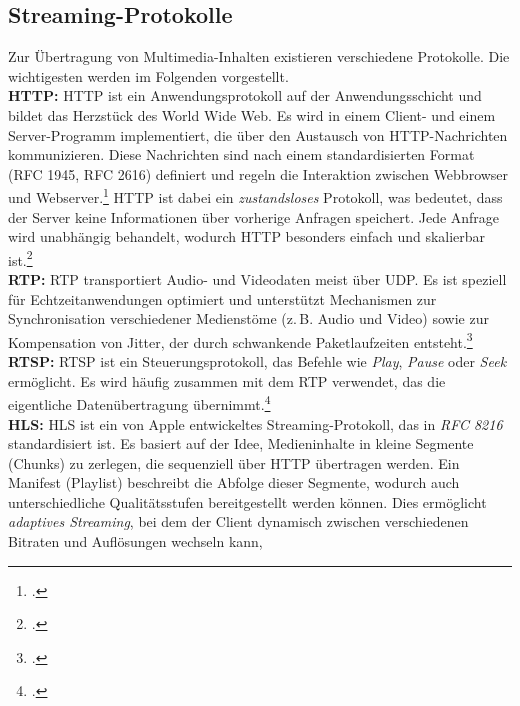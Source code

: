 \documentclass[12pt,a4paper]{report}
\begin{document}
  \subsection{Streaming-Protokolle} 
  Zur Übertragung von Multimedia-Inhalten existieren verschiedene Protokolle. 
  Die wichtigesten werden im Folgenden vorgestellt.  
  \\
  \newline
  \textbf{HTTP:}
  \ac{HTTP} ist ein Anwendungsprotokoll auf der Anwendungsschicht und bildet das Herzstück des World Wide Web. 
  Es wird in einem Client- und einem Server-Programm implementiert, die über den Austausch von \ac{HTTP}-Nachrichten kommunizieren. 
  Diese Nachrichten sind nach einem standardisierten Format (RFC 1945, RFC 2616) definiert und regeln die Interaktion zwischen Webbrowser und Webserver.\footcite[Vgl.][S.~126]{kurose_networking} 
  \ac{HTTP} ist dabei ein \emph{zustandsloses} Protokoll, was bedeutet, dass der Server keine Informationen über vorherige Anfragen speichert. 
  Jede Anfrage wird unabhängig behandelt, wodurch \ac{HTTP} besonders einfach und skalierbar ist.\footcite[Vgl.][S.~128]{kurose_networking}   
  \\
  \newline
  \textbf{RTP:}  
  \ac{RTP} transportiert Audio- und Videodaten meist über \ac{UDP}. 
  Es ist speziell für Echtzeitanwendungen optimiert und unterstützt Mechanismen zur 
  Synchronisation verschiedener Medienstöme (z.\,B. Audio und Video) 
  sowie zur Kompensation von Jitter, der durch schwankende Paketlaufzeiten entsteht.\footcite[Vgl.][S.~546~ff.]{tanenbaum_computernetworks}   
  \\
  \newline
  \textbf{RTSP:}  
  \ac{RTSP} ist ein Steuerungsprotokoll, das Befehle wie \emph{Play}, \emph{Pause} oder \emph{Seek} ermöglicht. 
  Es wird häufig zusammen mit dem \ac{RTP} verwendet, 
  das die eigentliche Datenübertragung übernimmt.\footcite[Vgl.][S.~638~f.]{kurose_networking}  
  \\
  \newline
  \textbf{HLS:}
  \ac{HLS} ist ein von Apple entwickeltes Streaming-Protokoll, das in \emph{RFC 8216} standardisiert ist.
  Es basiert auf der Idee, Medieninhalte in kleine Segmente (Chunks) zu zerlegen, die sequenziell über \ac{HTTP} übertragen werden.
  Ein Manifest (Playlist) beschreibt die Abfolge dieser Segmente, wodurch auch unterschiedliche Qualitätsstufen bereitgestellt werden können.
  Dies ermöglicht \emph{adaptives Streaming}, bei dem der Client dynamisch zwischen verschiedenen Bitraten und Auflösungen wechseln kann,
\end{document}
